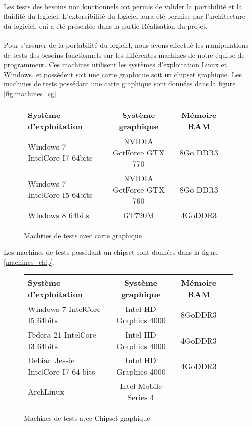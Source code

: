 \paragraph{}
Les tests des besoins non fonctionnels ont permis de valider la portabilité et la fluidité du logiciel. L'extensibilité du logiciel aura été permise par l'architecture du logiciel, qui a été présentée dans la partie Réalisation du projet.

\paragraph{}
Pour s'assurer de la portabilité du logiciel, nous avons effectué les manipulations de tests des besoins fonctionnels sur les différentes machines de notre équipe de programmeur. Ces machines utilisent les systèmes d'exploitation Linux et Windows, et possèdent soit une carte graphique soit un chipset graphique. Les machines de tests possédant une carte graphique sont données dans la figure \ref{fig:machines_cg}.

\begin{figure}[h]
  \begin{changemargin}{-4cm}{-4cm}
    \centering
    \begin{tabular}{|l|c|c|c|}
      \hline
      Système d'exploitation & Système graphique & Mémoire RAM \\ \hline \hline
      Windows 7 IntelCore I7 64bits & NVIDIA GetForce GTX 770 & 8Go DDR3 \\ \hline
      Windows 7 IntelCore I5 64bits & NVIDIA GetForce GTX 760 & 8Go DDR3 \\ \hline
      Windows 8 64bits & GT720M & 4GoDDR3 \\ \hline
    \end{tabular}
  \end{changemargin}
  \caption{Machines de tests avec carte graphique}
  \label{tab:machines_cg}
\end{figure}

Les machines de tests possédant un chipset sont données dans la figure \ref{machines_chip}.

\begin{figure}[h]
  \begin{changemargin}{-4cm}{-4cm}
    \centering
    \begin{tabular}{|l|c|c|c|}
      \hline
      Système d'exploitation & Système graphique & Mémoire RAM \\ \hline \hline
      Windows 7 IntelCore I5 64bits & Intel HD Graphics 4000 & 8GoDDR3 \\ \hline
      Fedora 21 IntelCore I3 64bits & Intel HD Graphics 4000 & 4GoDDR3 \\ \hline
      Debian Jessie IntelCore I7 64 bits & Intel HD Graphics 4000 & 4GoDDR3 \\ \hline
      ArchLinux & Intel Mobile Series 4 & \\ \hline
    \end{tabular}
  \end{changemargin}
  \caption{Machines de tests avec Chipset graphique}
  \label{tab:machines_chip}
\end{figure}

